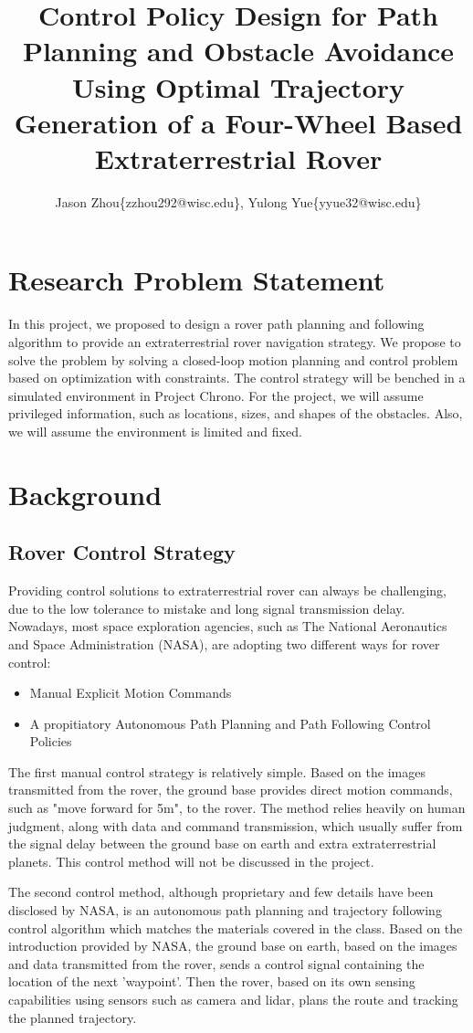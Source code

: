 \documentclass{article}
\title{Control Policy Design for Path Planning and Obstacle Avoidance Using Optimal Trajectory Generation of a Four-Wheel Based Extraterrestrial Rover}
\author{Jason Zhou\{zzhou292@wisc.edu\}, Yulong Yue\{yyue32@wisc.edu\}}
\begin{document}
\maketitle


\section{Research Problem Statement}
In this project, we proposed to design a rover path planning and following algorithm to provide an extraterrestrial rover navigation strategy. We propose to solve the problem by solving a closed-loop motion planning and control problem based on optimization with constraints. The control strategy will be benched in a simulated environment in Project Chrono. For the project, we will assume privileged information, such as locations, sizes, and shapes of the obstacles. Also, we will assume the environment is limited and fixed. 


\section{Background}
\subsection{Rover Control Strategy}
Providing control solutions to extraterrestrial rover can always be challenging, due to the low tolerance to mistake and long signal transmission delay. Nowadays, most space exploration agencies, such as The National Aeronautics and Space Administration (NASA), are adopting two different ways for rover control:

\begin{itemize}
    \item Manual Explicit Motion Commands
    \item A propitiatory Autonomous Path Planning and Path Following Control Policies
\end{itemize}

The first manual control strategy is relatively simple. Based on the images transmitted from the rover, the ground base provides direct motion commands, such as "move forward for 5m", to the rover. The method relies heavily on human judgment, along with data and command transmission, which usually suffer from the signal delay between the ground base on earth and extra extraterrestrial planets. This control method will not be discussed in the project.

The second control method, although proprietary and few details have been disclosed by NASA, is an autonomous path planning and trajectory following control algorithm which matches the materials covered in the class. Based on the introduction provided by NASA, the ground base on earth, based on the images and data transmitted from the rover, sends a control signal containing the location of the next 'waypoint'. Then the rover, based on its own sensing capabilities using sensors such as camera and lidar, plans the route and tracking the planned trajectory. \cite{NASAweb}
\end{document}
